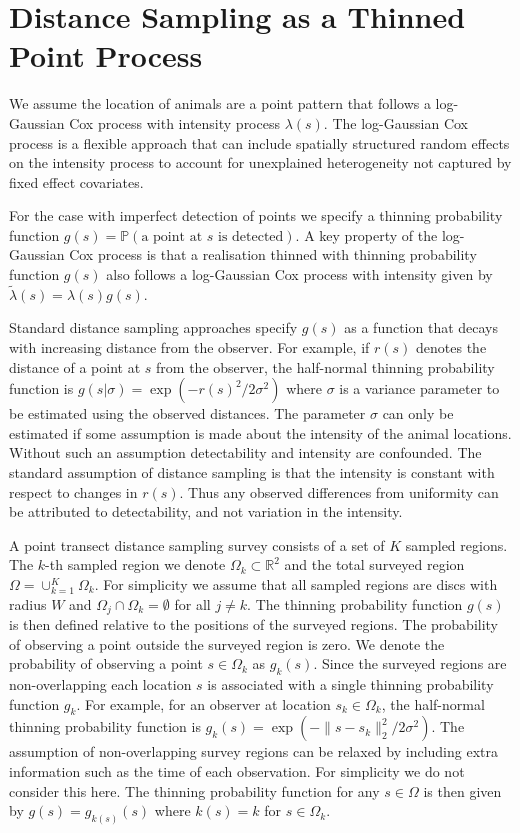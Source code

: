 \documentclass[preprint,12pt]{elsarticle}
\newcommand{\tl}{\tilde{\lambda}}   %
\begin{document}
\section*{Distance Sampling as a Thinned Point Process}

We assume the location of animals are a point pattern that follows a log-Gaussian Cox process with intensity process $\lambda(s)$.  The log-Gaussian Cox process is a flexible approach that can include spatially structured random effects on the intensity process to account for unexplained heterogeneity not captured by fixed effect covariates.

\sloppy For the case with imperfect detection of points we specify a thinning probability function $g(s) = \mathbb{P}(\text{a point at $s$ is detected})$. A key property of the log-Gaussian Cox process is that a realisation thinned with thinning probability function $g(s)$ also follows a log-Gaussian Cox process with intensity given by $\tl(s) = \lambda(s)g(s)$.

Standard distance sampling approaches specify $g(s)$ as a function that decays with increasing distance from the observer.  For example, if $r(s)$ denotes the distance of a point at $s$ from the observer, the half-normal thinning probability function is $g(s | \sigma) = \exp(-r(s)^2 / 2\sigma^2)$ where $\sigma$ is a variance parameter to be estimated using the observed distances.  The parameter $\sigma$ can only be estimated if some assumption is made about the intensity of the animal locations.  Without such an assumption detectability and intensity are confounded.  The standard assumption of distance sampling is that the intensity is constant with respect to changes in $r(s)$.  Thus any observed differences from uniformity can be attributed to detectability, and not variation in the intensity.

A point transect distance sampling survey consists of a set of $K$ sampled regions.  The $k$-th sampled region we denote $\Omega_k \subset \mathbb{R}^2$ and the total surveyed region $\Omega = \cup_{k=1}^K \Omega_k$.  For simplicity we assume that all sampled regions are discs with radius $W$ and $\Omega_j \cap \Omega_k = \emptyset$ for all $j \neq k$.  The thinning probability function $g(s)$ is then defined relative to the positions of the surveyed regions.  The probability of observing a point outside the surveyed region is zero.  We denote the probability of observing a point $s \in \Omega_k$ as $g_k(s)$.  Since the surveyed regions are non-overlapping each location $s$ is associated with a single thinning probability function $g_k$.  For example, for an observer at location $s_k \in \Omega_k$, the half-normal thinning probability function is $g_k(s) = \exp(-\lVert s - s_k \rVert_2^2 / 2\sigma^2)$. The assumption of non-overlapping survey regions can be relaxed by including extra information such as the time of each observation.  For simplicity we do not consider this here.  The thinning probability function for any $s \in \Omega$ is then given by $g(s) = g_{k(s)}(s)$ where $k(s) = k$ for $s \in \Omega_k$.
\end{document}
